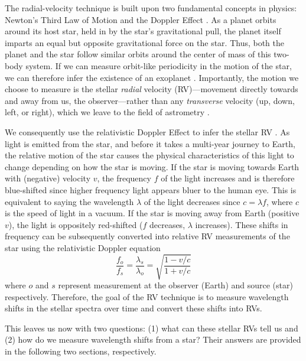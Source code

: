 The radial-velocity technique is built upon two fundamental concepts in physics: Newton's Third Law of Motion \citep{newton_philosophiae_1687} and the Doppler Effect \citep{doppler_ueber_1903}. As a planet orbits around its host star, held in by the star's gravitational pull, the planet itself imparts an equal but opposite gravitational force on the star. Thus, both the planet and the star follow similar orbits around the center of mass of this two-body system. If we can measure orbit-like periodicity in the motion of the star, we can therefore infer the existence of an exoplanet \citep{struve_proposal_1952, lovis_radial_2011}. Importantly, the motion we choose to measure is the stellar \textit{radial} velocity (RV)---movement directly towards and away from us, the observer---rather than any \textit{transverse} velocity (up, down, left, or right), which we leave to the field of astrometry \citep{perryman_history_2012}.

We consequently use the relativistic Doppler Effect to infer the stellar RV \citep{einstein_uber_1907}. As light is emitted from the star, and before it takes a multi-year journey to Earth, the relative motion of the star causes the physical characteristics of this light to change depending on how the star is moving. If the star is moving towards Earth with (negative) velocity $v$, the frequency $f$ of the light increases and is therefore blue-shifted since higher frequency light appears bluer to the human eye. This is equivalent to saying the wavelength $\lambda$ of the light decreases since $c = \lambda f$, where $c$ is the speed of light in a vacuum. If the star is moving away from Earth (positive $v$), the light is oppositely red-shifted ($f$ decreases, $\lambda$ increases). These shifts in frequency can be subsequently converted into relative RV measurements of the star using the relativistic Doppler equation
\begin{equation}
    \frac{f_o}{f_s} = \frac{\lambda_s}{\lambda_o} = \sqrt{\frac{1 - v/c}{1 + v/c}}
    \label{eq:relative-doppler-effect}
\end{equation}
where $o$ and $s$ represent measurement at the observer (Earth) and source (star) respectively. Therefore, the goal of the RV technique is to measure wavelength shifts in the stellar spectra over time and convert these shifts into RVs.

This leaves us now with two questions: (1) what can these stellar RVs tell us and (2) how do we measure wavelength shifts from a star? Their answers are provided in the following two sections, respectively.

